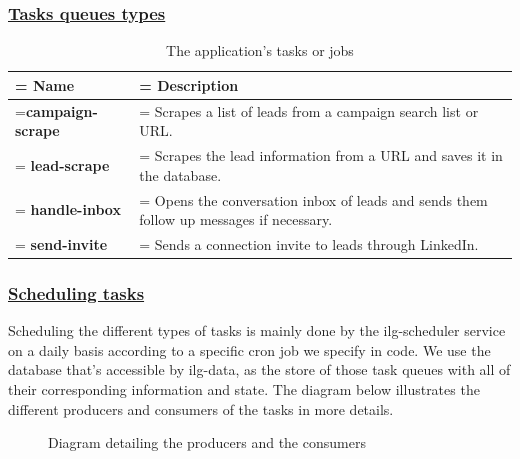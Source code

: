 \subsubsection*{\underline{Tasks queues types}}
\begin{table}[H]
	\renewcommand{\arraystretch}{1.5}%
	\caption{The application's tasks or jobs}
	\centering
	\medskip
	\begin{tabularx}{1\textwidth} {
			| >{\hsize=0.7\hsize\linewidth=\hsize\centering\arraybackslash}X
			| >{\hsize=1.3\hsize\linewidth=\hsize\justifying\arraybackslash}X |}
		\hline
		\rowcolor{primary} \textbf{Name} & \noindent \textbf{Description}                                                                  \\
		\hline
		\textbf {campaign-scrape}        & \noindent Scrapes a list of leads from a campaign search list or URL.                           \\
		\hline
		\textbf {lead-scrape}            & \noindent Scrapes the lead information from a URL and saves it in the database.                 \\
		\hline
		\textbf {handle-inbox}           & \noindent Opens the conversation inbox of leads and sends them follow up messages if necessary. \\
		\hline
		\textbf {send-invite}            & \noindent Sends a connection invite to leads through LinkedIn.                                  \\
		\hline
	\end{tabularx}
\end{table}

\subsubsection*{\underline{Scheduling tasks}}
Scheduling the different types of tasks is mainly done by the ilg-scheduler service on a daily basis according to a specific cron job we specify in code.
We use the database that's accessible by ilg-data, as the store of those task queues with all of their corresponding information and state.
The diagram below illustrates the different producers and consumers of the tasks in more details.
\begin{figure}[H]
	\centering
	\caption{Diagram detailing the producers and the consumers}
	\label{fig:producer-consumer-diagram}
\end{figure}

